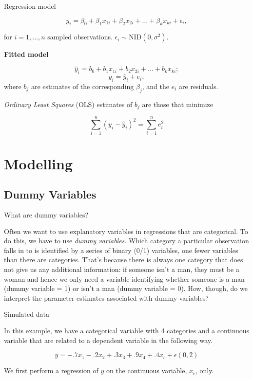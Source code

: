 \documentclass[10pt,ignorenonframetext,]{beamer}
\begin{document}
\begin{frame}{Regression model}

\[
y_i = \beta_0 + \beta_1 x_{1i} + \beta_2 x_{2i}+\dots+\beta_k x_{ki}
+ \epsilon_i,
\]

for \(i=1,\dots,n\) sampled observations.
\(\epsilon_i\sim \text{NID}(0,\sigma^2)\).

\textbf{Fitted model}

\[
\hat{y}_i = b_0 + b_1 x_{1i} + b_2 x_{2i} + \dots + b_k x_{ki};
\] \[
 y_i = \hat{y}_i + e_i,
\] where \(b_j\) are estimates of the corresponding \(\beta_j\), and the
\(e_i\) are residuals.

\emph{Ordinary Least Squares} (OLS) estimates of \(b_j\) are those that
minimize

\[
\sum_{i=1}^n (y_i - \hat{y}_i)^2 = \sum_{i=1}^n e_i^2
\]

\end{frame}

\section{Modelling}\label{modelling}

\subsection{Dummy Variables}\label{dummy-variables}

\begin{frame}{What are dummy variables?}

Often we want to use explanatory variables in regressions that are
categorical. To do this, we have to use \emph{dummy variables}. Which
category a particular observation falls in to is identified by a series
of binary (0/1) variables, one fewer variables than there are
categories. That's because there is always one category that does not
give us any additional information: if someone isn't a man, they must be
a woman and hence we only need a variable identifying whether someone is
a man (dummy variable = 1) or isn't a man (dummy variable = 0). How,
though, do we interpret the parameter estimates associated with dummy
variables?

\end{frame}

\begin{frame}{Simulated data}

In this example, we have a categorical variable with 4 categories and a
continuous variable that are related to a dependent variable in the
following way.

\[
y = -.7 x_1 - .2 x_2 + .3 x_3 + .9 x_4 + .4 x_c + \epsilon(0,2)
\]

We first perform a regression of \(y\) on the continuous variable,
\(x_c\), only.

\end{frame}
\end{document}
